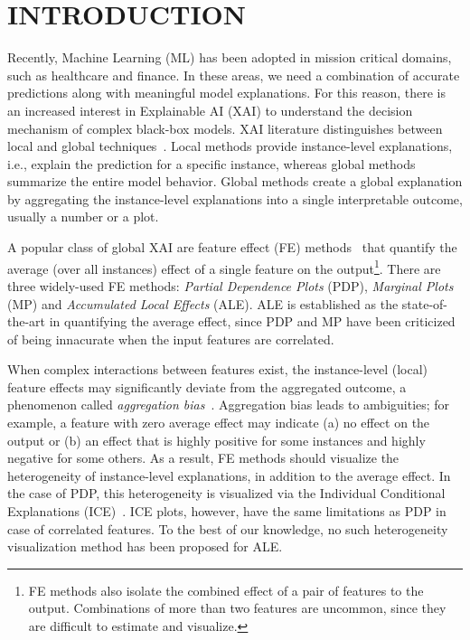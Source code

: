 \documentclass[twoside]{article}
\begin{document}
\section{INTRODUCTION}

Recently, Machine Learning (ML) has been adopted in mission critical domains,
such as healthcare and finance. In these areas, we need a combination
of accurate predictions along with meaningful model explanations. For this reason, there is an increased interest in Explainable
AI (XAI) to understand the decision mechanism of complex black-box
models. XAI literature distinguishes between local and global
techniques~\citep{Molnar2020interpretable}. Local methods provide
instance-level explanations, i.e., explain the prediction for a
specific instance, whereas global methods summarize the entire model
behavior. Global methods create a global explanation by aggregating the
instance-level explanations into a single interpretable outcome,
usually a number or a plot.  

A popular class of global XAI are feature effect (FE)
methods~\citep{Gromping2020MAEP} that quantify the average (over all
instances) effect of a single feature on the output\footnote{FE
  methods also isolate the combined effect of a pair of features to
  the output. Combinations of more than two features are uncommon,
  since they are difficult to estimate and visualize.}. There are
three widely-used FE methods: \emph{Partial Dependence Plots}
(PDP)\citep{friedman2001greedy}, \emph{Marginal Plots}
(MP)\citep{apley2020visualizing} and \emph{Accumulated Local Effects}
(ALE)\citep{apley2020visualizing}. ALE is established as the
state-of-the-art in quantifying the average effect, since PDP and MP
have been criticized~\citep{Gromping2020MAEP} of being innacurate when
the input features are correlated.

When complex interactions between features exist, the instance-level
(local) feature effects may significantly deviate from the aggregated
outcome, a phenomenon called \emph{aggregation
  bias}~\citep{mehrabi2021survey}.  Aggregation bias leads to
ambiguities; for example, a feature with zero average effect may
indicate (a) no effect on the output or (b) an effect that is highly
positive for some instances and highly negative for some others. As a
result, FE methods should visualize the heterogeneity of
instance-level explanations, in addition to the average effect. In the
case of PDP, this heterogeneity is visualized via the Individual
Conditional Explanations (ICE)~\citep{goldstein2015peeking}. ICE
plots, however, have the same limitations as PDP in case of correlated
features. To the best of our knowledge, no such heterogeneity
visualization method has been proposed for ALE.
\end{document}
